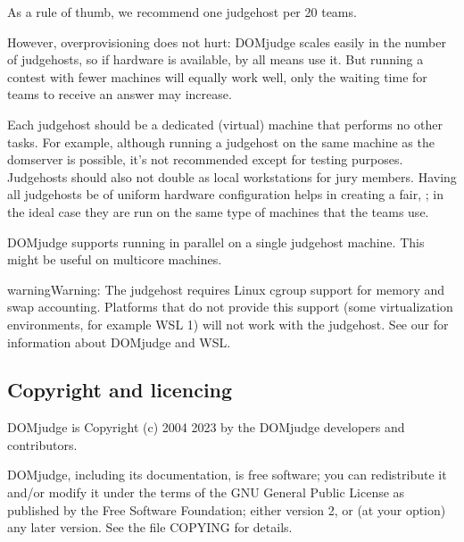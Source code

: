 \documentclass[a4paper,10pt,english,openany]{sphinxmanual}
\begin{document}
\sphinxAtStartPar
As a rule of thumb, we recommend one judgehost per 20 teams.

\sphinxAtStartPar
However, overprovisioning does not hurt: DOMjudge scales easily in the number
of judgehosts, so if hardware is available, by all means use it. But running a
contest with fewer machines will equally work well, only the waiting time for
teams to receive an answer may increase.

\sphinxAtStartPar
Each judgehost should be a dedicated (virtual) machine that performs no other
tasks. For example, although running a judgehost on the same machine as the
domserver is possible, it’s not recommended except for testing purposes.
Judgehosts should also not double as local workstations for jury members.
Having all judgehosts be of uniform hardware configuration helps in creating a
fair, {\hyperref[\detokenize{judging:judging-consistency}]{}}; in the ideal case
they are run on the same type of machines that the teams use.

\sphinxAtStartPar
DOMjudge supports running {\hyperref[\detokenize{config-advanced:multiple-judgedaemons}]{}}
in parallel on a single judgehost machine. This might be useful on multi\sphinxhyphen{}core
machines.

\begin{sphinxadmonition}{warning}{Warning:}
\sphinxAtStartPar
The judgehost requires Linux cgroup support for memory and swap accounting.
Platforms that do not provide this support (some virtualization environments,
for example WSL 1) will not work with the judgehost. See our  for information about DOMjudge and WSL.
\end{sphinxadmonition}


\subsection{Copyright and licencing}
\label{\detokenize{overview:copyright-and-licencing}}
\sphinxAtStartPar
DOMjudge is Copyright (c) 2004 \sphinxhyphen{} 2023 by the DOMjudge developers and contributors.

\sphinxAtStartPar
DOMjudge, including its documentation, is free software; you can redistribute
it and/or modify it under the terms of the GNU General Public License as
published by the Free Software Foundation; either version 2, or (at your
option) any later version. See the file COPYING for details.
\end{document}
